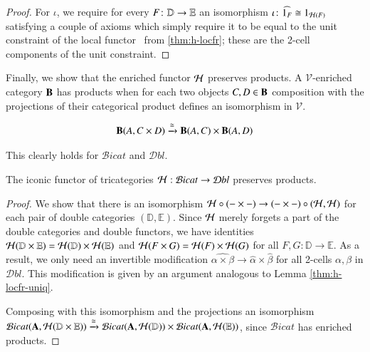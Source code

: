 \documentclass{amsart}
\begin{document}
\begin{proof}
  For $\iota$, we require for every $F\colon \mathbb{D}\to\mathbb{E}$ an isomorphism  $\iota\colon \widehat{1_F} \cong 1_{\mathcal{H}(F)}$ satisfying a couple of
  axioms which simply require it to be equal to the unit constraint of
  the local functor \cH\ from \autoref{thm:h-locfr}; these are the
  2-cell components of the unit constraint.  %
\end{proof}

Finally, we show that the enriched functor $\mathcal{H}$ preserves products. A $\mathcal{V}$-enriched category ${\bf B}$ has products when for each two objects $C,D \in {\bf B}$ composition with the projections of their categorical product defines an isomorphism in $\mathcal{V}$.

\begin{align}
{\bf B}(A, C \times D) \xrightarrow{\cong} {\bf B}(A,C) \times {\bf B}(A,D)
\end{align}

This clearly holds for $\mathcal{B}icat$ and $\mathcal{D}bl$. 

\begin{thm}
The iconic functor of tricategories $\mathcal{H}: \mathcal{B}icat \rightarrow \mathcal{D}bl$ preserves products.
\end{thm}

\begin{proof}
We show that there is an isomorphism $\mathcal{H} \circ (- \times -) \rightarrow (- \times -) \circ (\mathcal{H},\mathcal{H})$ for each pair of double categories $(\mathbb{D}, \mathbb{E})$.
Since $\mathcal{H}$ merely forgets a part of the double categories and double functors, we have identities 
$\mathcal{H}(\mathbb{D} \times \mathbb{E}) = \mathcal{H}(\mathbb{D}) \times \mathcal{H}(\mathbb{E})$ and  $\mathcal{H}(F \times G) = \mathcal{H}(F) \times \mathcal{H}(G)$ for all $F,G: \mathbb{D} \rightarrow \mathbb{E}$. As a result, we only need an invertible modification $\widehat{\alpha \times \beta} \rightarrow \hat{\alpha} \times \hat{\beta}$ for all 2-cells $\alpha, \beta$ in $\mathcal{D}bl$. This modification is given by  an argument analogous to Lemma \ref{thm:h-locfr-uniq}. 
 
Composing with this isomorphism and the projections an isomorphism $\mathcal{B}icat({\bf A}, \mathcal{H}(\mathbb{D} \times \mathbb{E})) \xrightarrow{\cong} \mathcal{B}icat({\bf A}, \mathcal{H}(\mathbb{D})) \times \mathcal{B}icat({\bf A}, \mathcal{H}(\mathbb{E}))$, since $\mathcal{B}icat$ has enriched products.
\end{proof}
\end{document}
